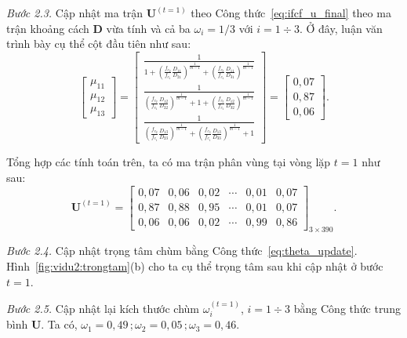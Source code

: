 \documentclass[a4paper,oneside]{book} %
\theoremstyle{plain}
\theoremstyle{plain}
\theoremstyle{nonumberplain}
\begin{document}
\textit{Bước 2.3.} Cập nhật ma trận $\bm U^{(t=1)}$ theo Công thức~\eqref{eq:ifcf_u_final} theo ma trận khoảng cách $\bm D$ vừa tính và cả ba $\omega_i=1/3$ với $i = 1\div 3$. Ở đây, luận văn trình bày cụ thể cột đầu tiên như sau:
$$
\begin{bmatrix}
	\mu_{11} \\[6pt]
	\mu_{12} \\[6pt]
	\mu_{13}
\end{bmatrix}
=
\begin{bmatrix}
	\frac{1}{
		1
		+ 
		\left(\frac{f_{c_2}}{f_{c_1}}\frac{D_{11}}{D_{21}}\right)^{\frac{1}{m-1}}
		+ 
		\left(\frac{f_{c_3}}{f_{c_1}}\frac{D_{11}}{D_{31}}\right)^{\frac{1}{m-1}}
	}\\
	\frac{1}{
		\left(\frac{f_{c_2}}{f_{c_1}}\frac{D_{12}}{D_{22}}\right)^{\frac{1}{m-1}}
		+1
		+ 
		\left(\frac{f_{c_3}}{f_{c_1}}\frac{D_{12}}{D_{32}}\right)^{\frac{1}{m-1}}
	}\\
	\frac{1}{
		\left(\frac{f_{c_2}}{f_{c_1}}\frac{D_{13}}{D_{23}}\right)^{\frac{1}{m-1}}
		+ 
		\left(\frac{f_{c_3}}{f_{c_1}}\frac{D_{13}}{D_{33}}\right)^{\frac{1}{m-1}}
		+1
	}
\end{bmatrix}=\begin{bmatrix}
0{,}07\\
0{,}87 \\
0{,}06
\end{bmatrix}.
$$



Tổng hợp các tính toán trên, ta có ma trận phân vùng tại vòng lặp $t=1$ như sau:
$$\bm U^{(t=1)} = \begin{bmatrix}
	0{,}07 & 0{,}06 & 0{,}02 & \cdots & 0{,}01 & 0{,}07\\
	0{,}87 & 0{,}88 & 0{,}95 & \cdots & 0{,}01 & 0{,}07\\
	0{,}06 & 0{,}06 & 0{,}02 & \cdots & 0{,}99 & 0{,}86
\end{bmatrix}_{3\times 390}.
$$

\textit{Bước 2.4.} Cập nhật trọng tâm chùm bằng Công thức~\ref{eq:theta_update}. Hình~\ref{fig:vidu2:trongtam}(b) cho ta cụ thể trọng tâm sau khi cập nhật ở bước $t=1$. 

\textit{Bước 2.5.} Cập nhật lại kích thước chùm $\omega_i^{(t=1)}$, $i = 1\div 3$ bằng Công thức trung bình $\bm U$. Ta có,
$\omega_1 = 0{,}49\,; \omega_2 = 0{,}05\,; \omega_3 = 0{,}46$.
 
\end{document}
